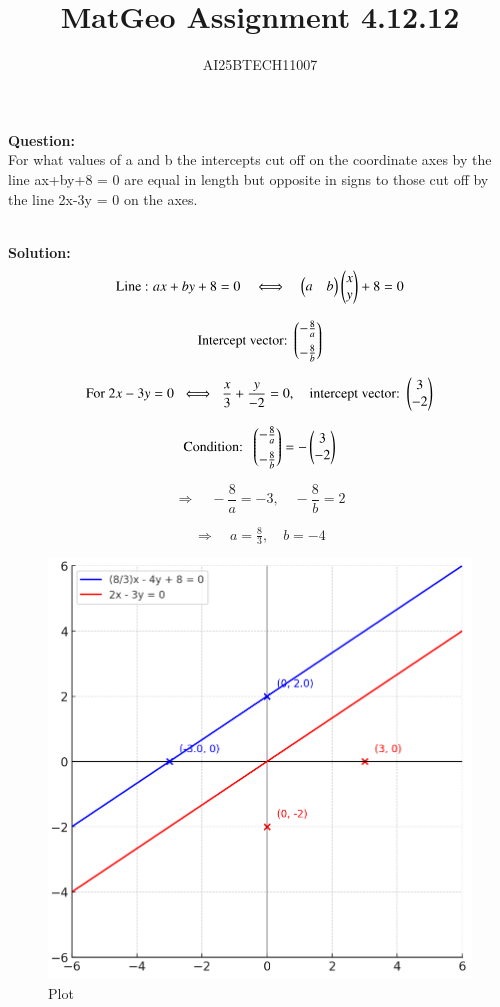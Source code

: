 \documentclass[journal]{IEEEtran}
\begin{document}

\vspace{3cm}

\title{MatGeo Assignment 4.12.12}
\author{AI25BTECH11007}
 \maketitle
{\let\newpage\relax\maketitle}

\renewcommand{\thefigure}{\theenumi}
\renewcommand{\thetable}{\theenumi}
\setlength{\intextsep}{10pt} %


\renewcommand{\thetable}{\theenumi}
\noindent
\textbf{Question:}\\
For what values of a and b the intercepts cut off on the coordinate axes by the line ax+by+8 = 0 are equal in length but opposite in signs to those cut off by the line 2x-3y = 0 on the axes.

\noindent\\
\textbf{Solution:}\\
\[
\text{Line : } ax+by+8=0 
\quad\Longleftrightarrow\quad 
\begin{pmatrix}a & b\end{pmatrix} \begin{pmatrix}x \\ y\end{pmatrix} + 8 = 0
\]
         
\[
\text{Intercept vector: }
\begin{pmatrix}-\tfrac{8}{a} \\[2mm] -\tfrac{8}{b}\end{pmatrix}
\]

\[
\text{For } 2x-3y=0 \;\;\Longleftrightarrow\;\; 
\frac{x}{3}+\frac{y}{-2}=0,
\quad
\text{intercept vector: }
\begin{pmatrix}3 \\ -2\end{pmatrix}
\]

\[
\text{Condition: }\;
\begin{pmatrix}-\tfrac{8}{a} \\[2mm] -\tfrac{8}{b}\end{pmatrix}
=
-\begin{pmatrix}3 \\ -2\end{pmatrix}
\]

\[
\Rightarrow\quad 
-\frac{8}{a} = -3, 
\quad 
-\frac{8}{b} = 2
\]

\[
\Rightarrow\quad 
a = \tfrac{8}{3}, 
\quad 
b = -4
\]

\begin{figure}
    \centering
    \includegraphics[width=0.75\linewidth]{figs/image.png}
    \caption{Plot}
    \label{fig:placeholder}
\end{figure}
\end{document}
